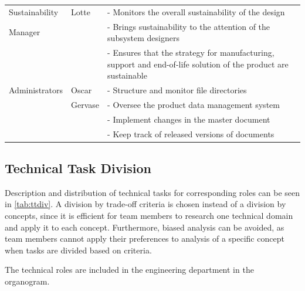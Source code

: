 \begin{table}[H]
\begin{tabular}{p{2.7cm}lp{10cm}}
        Sustainability & Lotte & - Monitors the overall sustainability of the design \\
        Manager &   & - Brings sustainability to the attention of the subsystem designers \\
         &  & - Ensures that the strategy for manufacturing, support and end-of-life solution of the product are sustainable \\ \hdashline
        Administrators & Oscar & - Structure and monitor file directories \\
         & Gervase & - Oversee the product data management system \\
         &  & - Implement changes in the master document \\
         &  & - Keep track of released versions of documents \\ \bottomrule
    \end{tabular}
\end{table}

\subsection{Technical Task Division}
Description and distribution of technical tasks for corresponding roles can be seen in \autoref{tab:ttdiv}. A division by trade-off criteria is chosen instead of a division by concepts, since it is efficient for team members to research one technical domain and apply it to each concept. Furthermore, biased analysis can be avoided, as team members cannot apply their preferences to analysis of a specific concept when tasks are divided based on criteria. 

The technical roles are included in the engineering department in the organogram.

